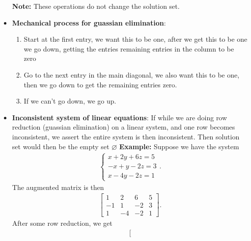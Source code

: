 \documentclass{report}
\begin{document}
\begin{itemize}
\begin{itemize}
                \end{itemize}
                \bigbreak \noindent 
                \textbf{Note:} These operations do not change the solution set.
            \item \textbf{Mechanical process for guassian elimination}:
                \begin{enumerate}
                    \item Start at the first entry, we want this to be one, after we get this to be one we go down, getting the entries remaining entries in the column to be zero
                    \item Go to the next entry in the main diagonal, we also want this to be one, then we go down to get the remaining entries zero.
                    \item If we can't go down, we go up. 
                \end{enumerate}
            \item \textbf{Inconsistent system of linear equations}: If while we are doing row reduction (guassian elimination) on a linear system, and one row becomes inconsistent, we assert the entire system is then inconsistent. Then solution set would then be the empty set $\varnothing$
                \bigbreak \noindent 
                \textbf{Example:} Suppose we have the system
                \begin{align*}
                    \begin{cases}
                        x + 2y + 6z =5 \\
                        -x + y -2z =3  \\
                        x -4y -2z = 1
                    \end{cases}
                .\end{align*}
                The augmented matrix is then
                \begin{align*}
                    \left[
                        \begin{array}{ccc|c}
                            1 &2 & 6 & 5 \\
                            -1 & 1 & -2 & 3 \\
                            1 & -4 & -2 & 1
                        \end{array}\right]
                .\end{align*}
                After some row reduction, we get
                \begin{align*}
                    \left[

\end{align*}
\end{itemize}
\end{document}
